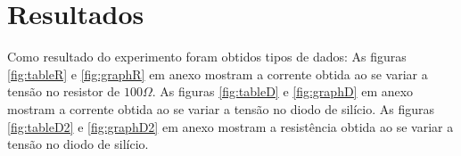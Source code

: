 \section{Resultados}
    Como resultado do experimento foram obtidos tipos de dados:
    \newline
    As figuras \ref{fig:tableR} e \ref{fig:graphR} em anexo mostram a
    corrente obtida ao se variar a tensão no resistor de $100\Omega$.
    \newline
    As figuras \ref{fig:tableD} e \ref{fig:graphD} em anexo mostram a
    corrente obtida ao se variar a tensão no diodo de silício.
    \newline
    As figuras \ref{fig:tableD2} e \ref{fig:graphD2} em anexo mostram a
    resistência obtida ao se variar a tensão no diodo de silício.